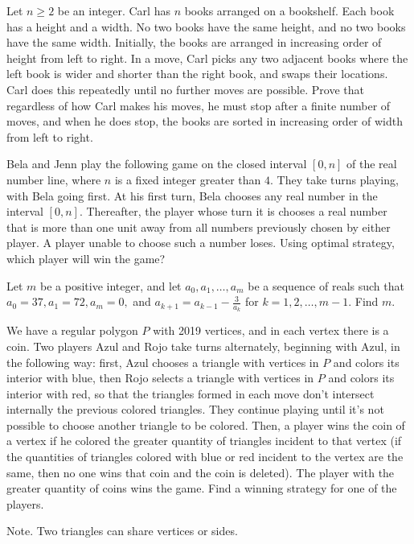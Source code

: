 \documentclass{article}
\begin{document}
\begin{prob}[USAJMO 2020/1]{3}
Let $n \geq 2$ be an integer. Carl has $n$ books arranged on a bookshelf. Each book has a height and a width. No two books have the same height, and no two books have the same width. Initially, the books are arranged in increasing order of height from left to right. In a move, Carl picks any two adjacent books where the left book is wider and shorter than the right book, and swaps their locations. Carl does this repeatedly until no further moves are possible. Prove that regardless of how Carl makes his moves, he must stop after a finite number of moves, and when he does stop, the books are sorted in increasing order of width from left to right.
\end{prob}

\begin{prob}[AMC 10B 2020/16]{4}
Bela and Jenn play the following game on the closed interval $[0, n]$ of the real number line, where $n$ is a fixed integer greater than $4$. They take turns playing, with Bela going first. At his first turn, Bela chooses any real number in the interval $[0, n]$. Thereafter, the player whose turn it is chooses a real number that is more than one unit away from all numbers previously chosen by either player. A player unable to choose such a number loses. Using optimal strategy, which player will win the game?
\end{prob}

\begin{prob}[AIME II 2005/11]{4}
Let $m$ be a positive integer, and let $a_0, a_1,\ldots,a_m$ be a sequence of reals such that $a_0 = 37, a_1 = 72, a_m = 0,$ and $a_{k+1} = a_{k-1} - \frac 3{a_k}$ for $k = 1,2,\ldots, m-1.$ Find $m.$
\end{prob}

\begin{req}[OMCC 2019/2]{4}
We have a regular polygon $P$ with 2019 vertices, and in each vertex there is a coin. Two players Azul and Rojo take turns alternately, beginning with Azul, in the following way: first, Azul chooses a triangle with vertices in $P$ and colors its interior with blue, then Rojo selects a triangle with vertices in $P$ and colors its interior with red, so that the triangles formed in each move don't intersect internally the previous colored triangles. They continue playing until it's not possible to choose another triangle to be colored. Then, a player wins the coin of a vertex if he colored the greater quantity of triangles incident to that vertex (if the quantities of triangles colored with blue or red incident to the vertex are the same, then no one wins that coin and the coin is deleted). The player with the greater quantity of coins wins the game. Find a winning strategy for one of the players.

Note. Two triangles can share vertices or sides.
\end{req}
\end{document}
